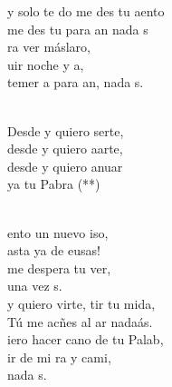 \documentclass[12pt]{article}
\begin{document}
\begin{multicols*}{2}
\begin{cancion}%
	y solo te do  me des tu aento\\
	 me des tu  para an nada s \\
	ra ver máslaro,\\
	uir noche y a, \\
	temer a  para an, nada s. \\\jump\\
	\begin{chorus}%
	Desde y quiero serte,\\
	desde y quiero aarte,\\
	desde y quiero anuar\\
	ya tu Pabra (**)\\
	\end{chorus}%
	\jump\\
	ento un nuevo iso,\\
	asta ya de eusas!\\
	me despera tu ver,\\
	una vez s. \\
\jump
	y quiero virte, tir tu mida,\\
	 Tú me acñes al ar nadaás.\\
	iero hacer cano de tu Palab,\\
	ir de mi ra y cami,\\
	nada s. \\
\end{cancion}%


\end{multicols*}
\end{document}
